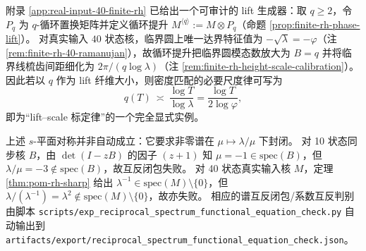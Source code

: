 \begin{remark}[对 \texorpdfstring{$\lambda=\varphi^2$}{lambda=phi^2} 的显式 lift 生成器：用循环提升把 \texorpdfstring{$B$}{B} 线性做大]\label{rem:critical-circle-mode-growth-cyclic-lift}
附录 \ref{app:real-input-40-finite-rh} 已给出一个可审计的 lift 生成器：取 \(q\ge 2\)，令 \(P_q\) 为 \(q\)-循环置换矩阵并定义循环提升
\(
M^{\langle q\rangle}:=M\otimes P_q
\)（命题 \ref{prop:finite-rh-phase-lift}）。
对真实输入 \(40\) 状态核，临界圆上唯一达界特征值为 \(-\sqrt{\lambda}=-\varphi\)（注 \ref{rem:finite-rh-40-ramanujan}），故循环提升把临界圆模态数放大为 \(B=q\) 并将临界线梳齿间距细化为
\(
2\pi/(q\log\lambda)
\)（注 \ref{rem:finite-rh-height-scale-calibration}）。
因此若以 \(q\) 作为 lift 纤维大小，则密度匹配的必要尺度律可写为
\[
q(T)\ \asymp\ \frac{\log T}{\log\lambda}
=\frac{\log T}{2\log\varphi},
\]
即为“lift--scale 标定律”的一个完全显式实例。
\end{remark}

\begin{remark}\label{rem:reciprocal-check-outcome}
上述 $s$-平面对称并非自动成立：它要求非零谱在 $\mu\mapsto\lambda/\mu$ 下封闭。
对 10 状态同步核 $B$，由 \(\det(I-zB)\) 的因子 \((z+1)\) 知 \(\mu=-1\in\mathrm{spec}(B)\)，但 \(\lambda/\mu=-3\notin\mathrm{spec}(B)\)，故互反闭包失败。
对 40 状态真实输入核 $M$，定理 \ref{thm:pom-rh-sharp} 给出 \(\lambda^{-1}\in\mathrm{spec}(M)\setminus\{0\}\)，但 \(\lambda/(\lambda^{-1})=\lambda^2\notin\mathrm{spec}(M)\setminus\{0\}\)，故亦失败。
相应的谱互反闭包/系数互反判别由脚本 \texttt{scripts/exp\_reciprocal\_spectrum\_functional\_equation\_check.py} 自动输出到
\texttt{artifacts/export/reciprocal\_spectrum\_functional\_equation\_check.json}。
\end{remark}
